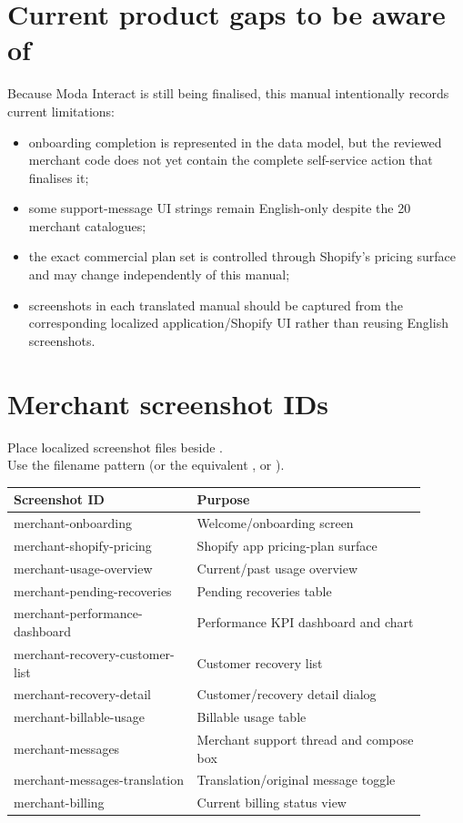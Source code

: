 \chapter{Current product gaps to be aware of}

Because Moda Interact is still being finalised, this manual intentionally records current limitations:
\begin{itemize}
  \item onboarding completion is represented in the data model, but the reviewed merchant code does not yet contain the complete self-service action that finalises it;
  \item some support-message UI strings remain English-only despite the 20 merchant catalogues;
  \item the exact commercial plan set is controlled through Shopify's pricing surface and may change independently of this manual;
  \item screenshots in each translated manual should be captured from the corresponding localized application/Shopify UI rather than reusing English screenshots.
\end{itemize}

\appendix
\chapter{Merchant screenshot IDs}

Place localized screenshot files beside .\\
Use the filename pattern  (or the equivalent ,  or ).

\begin{longtable}{P{0.40\linewidth}P{0.50\linewidth}}
\toprule
\textbf{Screenshot ID} & \textbf{Purpose}\\
\midrule
\endhead
merchant-onboarding & Welcome/onboarding screen\\
merchant-shopify-pricing & Shopify app pricing-plan surface\\
merchant-usage-overview & Current/past usage overview\\
merchant-pending-recoveries & Pending recoveries table\\
merchant-performance-dashboard & Performance KPI dashboard and chart\\
merchant-recovery-customer-list & Customer recovery list\\
merchant-recovery-detail & Customer/recovery detail dialog\\
merchant-billable-usage & Billable usage table\\
merchant-messages & Merchant support thread and compose box\\
merchant-messages-translation & Translation/original message toggle\\
merchant-billing & Current billing status view\\
\bottomrule
\end{longtable}
